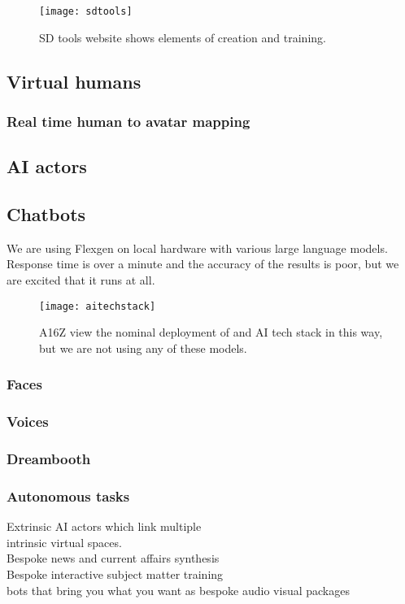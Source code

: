 \begin{figure}
  \centering
    \texttt{[image: sdtools]}
  \caption{SD tools website shows elements of creation and training.}
  	\label{fig:SDTools}
\end{figure}


\subsection{Virtual humans}
\subsubsection{Real time human to avatar mapping}
\subsection{AI actors}
\subsection{Chatbots}
We are using Flexgen \cite{Sheng2023} on local hardware with various large language models. Response time is over a minute and the accuracy of the results is poor, but we are excited that it runs at all.

\begin{figure}
  \centering
    \texttt{[image: aitechstack]}
  \caption{A16Z view the nominal deployment of and AI tech stack in this way, but we are not using any of these models.}
  	\label{fig:aitechstack}
\end{figure}


\subsubsection{Faces}
\subsubsection{Voices}
\subsubsection{Dreambooth}
\subsubsection{Autonomous tasks}

Extrinsic AI actors which link multiple\\ intrinsic virtual spaces.\\
Bespoke news and current affairs synthesis\\
Bespoke interactive subject matter training\\
bots that bring you what you want as bespoke audio visual packages
